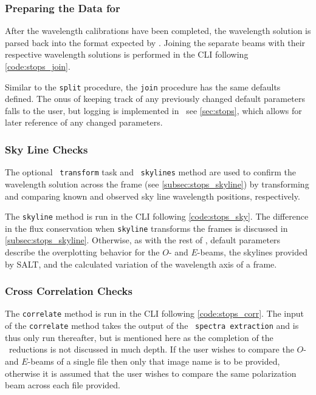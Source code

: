 \subsubsection{Preparing the Data for \polsalt}

After the wavelength calibrations have been completed, the wavelength solution is parsed back into the format expected by \polsalt. Joining the separate beams with their respective wavelength solutions is performed in the \gls{CLI} following \autoref{code:stops_join}.

Similar to the \texttt{split} procedure, the \texttt{join} procedure has the same defaults defined. The onus of keeping track of any previously changed default parameters falls to the user, but logging is implemented in \stops\, see \autoref{sec:stops}, which allows for later reference of any changed parameters.

\subsubsection{Sky Line Checks} \label{subsec:reduc_sky}

The optional \iraf\ \texttt{transform} task and \stops\ \texttt{skylines} method are used to confirm the wavelength solution across the frame (see \autoref{subsec:stops_skyline}) by transforming and comparing known and observed sky line wavelength positions, respectively.

The \texttt{skyline} method is run in the \gls{CLI} following \autoref{code:stops_sky}. The difference in the flux conservation when \texttt{skyline} transforms the frames is discussed in \autoref{subsec:stops_skyline}. Otherwise, as with the rest of \stops, default parameters describe the overplotting behavior for the $O$- and $E$-beams, the skylines provided by \gls{SALT}, and the calculated variation of the wavelength axis of a frame.

\subsubsection{Cross Correlation Checks} \label{subsec:reduc_corr}

The \texttt{correlate} method is run in the \gls{CLI} following \autoref{code:stops_corr}. The input of the \texttt{correlate} method takes the output of the \polsalt\ \texttt{spectra extraction} and is thus only run thereafter, but is mentioned here as the completion of the \polsalt\ reductions is not discussed in much depth. If the user wishes to compare the $O$- and $E$-beams of a single file then only that image name is to be provided, otherwise it is assumed that the user wishes to compare the same polarization beam across each file provided.

